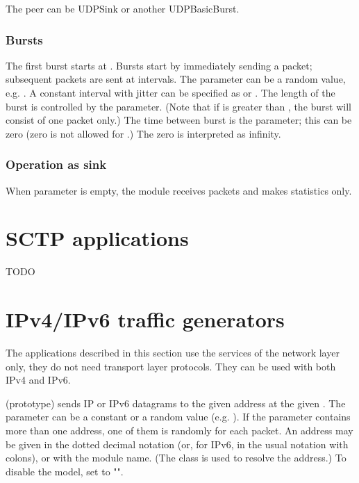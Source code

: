 The peer can be UDPSink or another UDPBasicBurst.

\subsubsection*{Bursts}

The first burst starts at . Bursts start by immediately sending
a packet; subsequent packets are sent at  intervals. The
 parameter can be a random value, e.g. .
A constant interval with jitter can be specified as 
or . The length of the burst is controlled by the
 parameter. (Note that if  is greater than
, the burst will consist of one packet only.) The time between
burst is the  parameter; this can be zero (zero is not
allowed for .) The zero  is interpreted as infinity.

\subsubsection*{Operation as sink}

When  parameter is empty, the module receives packets and makes statistics only.


\section{SCTP applications}

TODO


\section{IPv4/IPv6 traffic generators}
\label{sec:apps:ipv4/ipv6-traffic-generators}

The applications described in this section use the services of the network
layer only, they do not need transport layer protocols.
They can be used with both IPv4 and IPv6.

 (prototype) sends IP or IPv6 datagrams to the
given address at the given .
The  parameter can be a constant or a random value (e.g.
). If the  parameter contains more than
one address, one of them is randomly for each packet. An address may be given in
the dotted decimal notation (or, for IPv6, in the usual notation with colons),
or with the module name. (The  class is used to
resolve the address.) To disable the model, set  to "".

